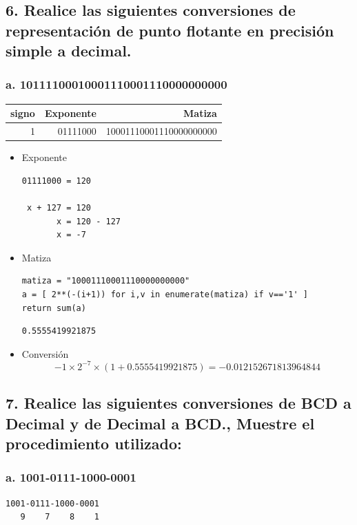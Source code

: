 \documentclass[12pt]{article}
\begin{document}
\subsection*{6. Realice las siguientes conversiones de representación de punto flotante en precisión simple a decimal.}
\label{sec:org79f6262}
\subsubsection*{a. 10111100010001110001110000000000}
\label{sec:orgd6e3535}
\begin{center}
\begin{tabular}{rrr}
\hline
signo & Exponente & Matiza\\
\hline
1 & 01111000 & 10001110001110000000000\\
\hline
\end{tabular}
\end{center}

\begin{itemize}
\item Exponente
\label{sec:org7628afd}
\begin{verbatim}
01111000 = 120

 x + 127 = 120 
       x = 120 - 127
       x = -7
\end{verbatim}

\item Matiza
\label{sec:org384fca2}
\begin{verbatim}
matiza = "10001110001110000000000"
a = [ 2**(-(i+1)) for i,v in enumerate(matiza) if v=='1' ]
return sum(a)
\end{verbatim}

\begin{verbatim}
0.5555419921875
\end{verbatim}

\item Conversión
\label{sec:orgdd219f5}
\[
-1 \times 2^{-7} \times (1+0.5555419921875) = -0.012152671813964844
\]
\end{itemize}

\subsection*{7. Realice las siguientes conversiones de BCD a Decimal y de Decimal a BCD., Muestre el procedimiento utilizado:}
\label{sec:org8ec5b44}
\subsubsection*{a. 1001-0111-1000-0001}
\label{sec:orgf352e43}
\begin{verbatim}
1001-0111-1000-0001
   9    7    8    1
\end{verbatim}
\end{document}
